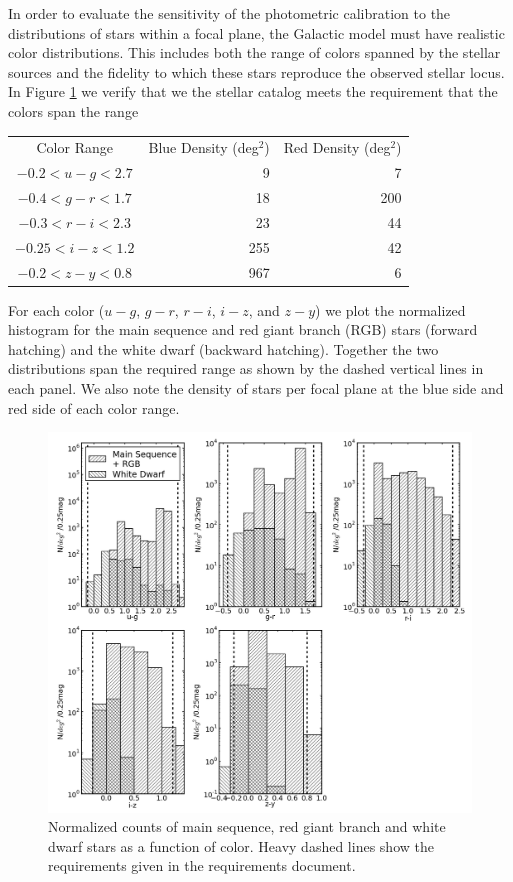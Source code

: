 \documentclass[]{article}
\begin{document}
In order to evaluate the sensitivity of the photometric calibration to
the distributions of stars within a focal plane, the Galactic model
must have realistic color distributions.  This includes both the range
of colors spanned by the stellar sources and the fidelity to which
these stars reproduce the observed stellar locus. In Figure
\ref{fig:starcolorspan} we verify that we the stellar catalog meets
the requirement that the colors span the range
\begin{center}
\begin{tabular}{c|r|r}
Color Range& Blue Density (deg$^2$) & Red Density (deg$^2$)\\
      $ -0.2 < u-g <        2.7 $&9&7\\
       $  -0.4  <  g-r <       1.7 $&18&200\\
        $ -0.3   <  r-i <    2.3 $&23&44\\
        $  -0.25 < i-z <       1.2 $&255&42\\ 
        $  -0.2 <  z-y   <    0.8 $&967&6
\end{tabular}
\end{center}
For each color ($u-g$, $g-r$, $r-i$,
$i-z$, and $z-y$) we plot the normalized histogram for the main
sequence and red giant branch (RGB) stars (forward hatching) and the
white dwarf (backward hatching).  Together the two distributions span
the required range as shown by the dashed vertical lines in each
panel.  We also note the density of stars per focal plane at the blue
side and red side of each color range.
\begin{figure}[ht]
\centering
\includegraphics[width=5in]{validation_figures/star_lsst_color_hist.png}
\caption{Normalized counts of main sequence, red giant branch and white dwarf stars as a function of color.  Heavy dashed lines show the requirements given in the requirements document.\label{fig:starcolorspan}}
\end{figure}
\end{document}
